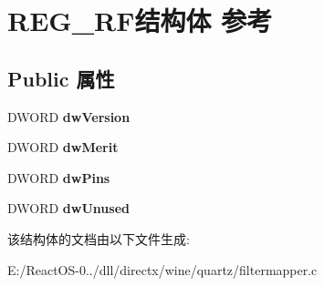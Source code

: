 \hypertarget{struct_r_e_g___r_f}{}\section{R\+E\+G\+\_\+\+R\+F结构体 参考}
\label{struct_r_e_g___r_f}
\subsection*{Public 属性}
\begin{DoxyCompactItemize}
\item 
\mbox{\label{struct_r_e_g___r_f_a013d3d913ea768122c39411f28777f42}} 
D\+W\+O\+RD {\bfseries dw\+Version}
\item 
\mbox{\label{struct_r_e_g___r_f_acbb990c16230b7b4573f6b0ae4b5d48c}} 
D\+W\+O\+RD {\bfseries dw\+Merit}
\item 
\mbox{\label{struct_r_e_g___r_f_acfb1ece69ed904afa6c3f8b37ee99865}} 
D\+W\+O\+RD {\bfseries dw\+Pins}
\item 
\mbox{\label{struct_r_e_g___r_f_a2b3aa281a5f1ec1aec0a8a45c0113901}} 
D\+W\+O\+RD {\bfseries dw\+Unused}
\end{DoxyCompactItemize}


该结构体的文档由以下文件生成\+:\begin{DoxyCompactItemize}
\item 
E\+:/\+React\+O\+S-\/0../dll/directx/wine/quartz/filtermapper.\+c\end{DoxyCompactItemize}
